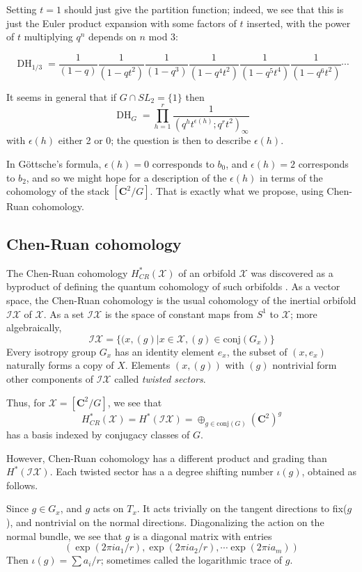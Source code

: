 \documentclass{amsart}[12pt]
\theoremstyle{definition}
\newcommand{\C}{\mathbf{C}}
\DeclareMathOperator{\DC}{DH}
\begin{document}
Setting $t=1$ should just give the partition function; indeed, we see that this is just the Euler product expansion with some factors of $t$ inserted, with the power of $t$ multiplying $q^n$ depends on $n$ mod 3:

$$\DC_{1/3}=\frac{1}{(1-q)}\frac{1}{(1-qt^2)}\frac{1}{(1-q^3)}\frac{1}{(1-q^4t^2)}
\frac{1}{(1-q^5t^4)}\frac{1}{(1-q^6t^2)}\cdots$$

 It seems in general that if $G\cap SL_2=\{1\}$ then
$$\DC_{G}=\prod_{h=1}^r \frac{1}{(q^h t^{\epsilon(h)}; q^r t^2)_\infty}$$
with $\epsilon(h)$ either 2 or 0; the question is then to describe $\epsilon(h)$.

In G\"ottsche's formula, $\epsilon(h)=0$ corresponds to $b_0$, and $\epsilon(h)=2$ corresponds to $b_2$, and so we might hope for a description of the $\epsilon(h)$ in terms of the cohomology of the stack $[\C^2/G]$.  That is exactly what we propose, using Chen-Ruan cohomology.



\subsection{Chen-Ruan cohomology}

The Chen-Ruan cohomology $H_{CR}^*(\mathcal{X})$ of an orbifold $\mathcal{X}$ was discovered as a byproduct of defining the quantum cohomology of such orbifolds \cite{chenruancohomology}.  As a vector space, the Chen-Ruan cohomology is the usual cohomology of the inertial orbifold $\mathcal{IX}$ of $\mathcal{X}$.  As a set $\mathcal{IX}$ is the space of constant maps from $S^1$ to $\mathcal{X}$; more algebraically, 
$$\mathcal{IX}=\{(x, (g)| x\in \mathcal{X}, (g)\in\textrm{conj}(G_x)\}$$
Every isotropy group $G_x$ has an identity element $e_x$, the subset of $(x, e_x)$ naturally forms a copy of $X$.  Elements $(x,(g))$ with $(g)$ nontrivial form other components of $\mathcal{IX}$ called \emph{twisted sectors}.

Thus, for $\mathcal{X}=[\C^2/G]$, we see that 
$$H_{CR}^*(\mathcal{X}) =H^*(\mathcal{IX})=\oplus_{g\in\textrm{conj}(G)} (\C^2)^g$$
has a basis indexed by conjugacy classes of $G$.

However, Chen-Ruan cohomology has a different product and grading than $H^*(\mathcal{IX})$.  Each twisted sector has a a degree shifting number $\iota(g)$, obtained as follows.

Since $g\in G_x$, and $g$ acts on $T_x$.  It acts trivially on the tangent directions to fix($g$), and nontrivial on the normal directions.  Diagonalizing the action on the normal bundle, we see that $g$ is a diagonal matrix with entries 
$$(\exp(2\pi i a_1/r), \exp(2\pi i a_2/r), \cdots \exp(2\pi i a_m))$$
Then $\iota(g)=\sum a_i/r$; sometimes called the logarithmic trace of $g$.
\end{document}

